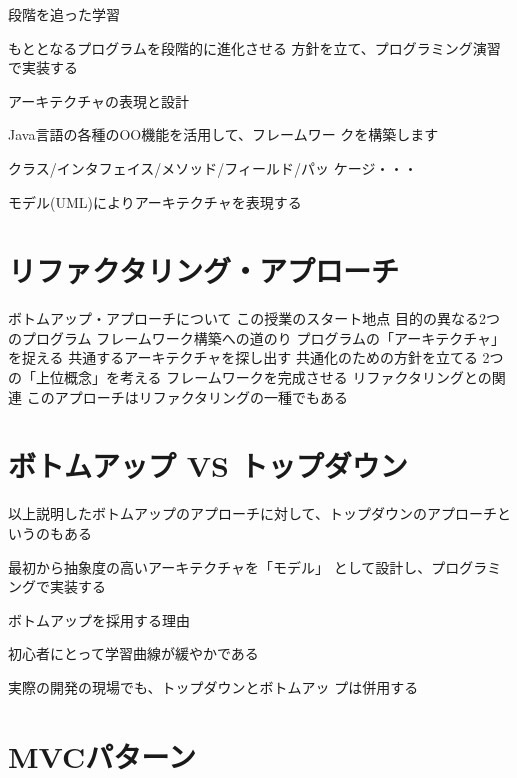 \documentclass[a4j,papersize]{jsbook}
\begin{document}
段階を追った学習

もととなるプログラムを段階的に進化させる
方針を立て、プログラミング演習で実装する

アーキテクチャの表現と設計

Java言語の各種のOO機能を活用して、フレームワー
クを構築します

クラス/インタフェイス/メソッド/フィールド/パッ
ケージ・・・

モデル(UML)によりアーキテクチャを表現する

\section{リファクタリング・アプローチ}

ボトムアップ・アプローチについて
この授業のスタート地点
 目的の異なる2つのプログラム
フレームワーク構築への道のり
 プログラムの「アーキテクチャ」を捉える
 共通するアーキテクチャを探し出す
 共通化のための方針を立てる
 2つの「上位概念」を考える
 フレームワークを完成させる
リファクタリングとの関連
 このアプローチはリファクタリングの一種でもある

\section{ボトムアップ VS トップダウン}

以上説明したボトムアップのアプローチに対して、トップダウンのアプローチというのもある

最初から抽象度の高いアーキテクチャを「モデル」
として設計し、プログラミングで実装する

ボトムアップを採用する理由

初心者にとって学習曲線が緩やかである

実際の開発の現場でも、トップダウンとボトムアッ
プは併用する

\section{MVCパターン}
\end{document}
